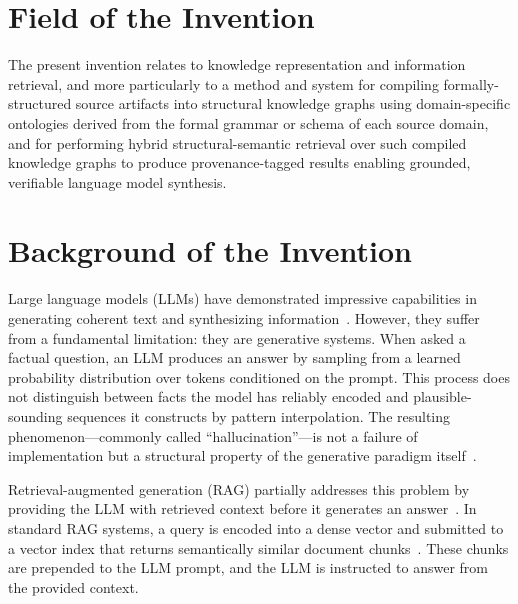 \documentclass[12pt]{article}
\begin{document}
\section*{Field of the Invention}

The present invention relates to knowledge representation and information
retrieval, and more particularly to a method and system for compiling
formally-structured source artifacts into structural knowledge graphs using
domain-specific ontologies derived from the formal grammar or schema of each
source domain, and for performing hybrid structural-semantic retrieval over such
compiled knowledge graphs to produce provenance-tagged results enabling grounded,
verifiable language model synthesis.

\section*{Background of the Invention}

Large language models (LLMs) have demonstrated impressive capabilities in
generating coherent text and synthesizing information~\cite{brown2020gpt3,
chowdhery2022palm, touvron2023llama}. However, they suffer from a fundamental
limitation: they are generative systems. When asked a factual question, an LLM
produces an answer by sampling from a learned probability distribution over
tokens conditioned on the prompt. This process does not distinguish between facts
the model has reliably encoded and plausible-sounding sequences it constructs by
pattern interpolation. The resulting phenomenon---commonly called
``hallucination''---is not a failure of implementation but a structural property
of the generative paradigm itself~\cite{ji2023hallucinationsurvey,
maynez2020faithfulness}.

Retrieval-augmented generation (RAG) partially addresses this problem by
providing the LLM with retrieved context before it generates an
answer~\cite{lewis2020rag, guu2020realm}. In standard RAG systems, a query is
encoded into a dense vector and submitted to a vector index that returns
semantically similar document chunks~\cite{johnson2021faiss, karpukhin2020dpr}.
These chunks are prepended to the LLM prompt, and the LLM is instructed to
answer from the provided context.
\end{document}
